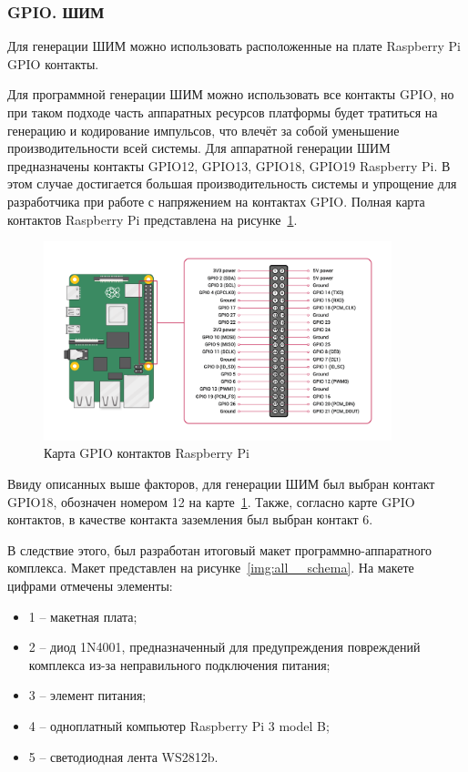 \subsubsection{GPIO. ШИМ}

Для генерации ШИМ можно использовать расположенные на плате Raspberry Pi GPIO контакты.

Для программной генерации ШИМ можно использовать все контакты GPIO, но при таком подходе часть аппаратных ресурсов платформы будет тратиться на генерацию и кодирование импульсов, что влечёт за собой уменьшение производительности всей системы. Для аппаратной генерации ШИМ предназначены контакты GPIO12, GPIO13, GPIO18, GPIO19 Raspberry Pi. В этом случае достигается большая производительность системы и упрощение для разработчика при работе с напряжением на контактах GPIO. Полная карта контактов Raspberry Pi представлена на рисунке~\ref{img:raspberrypi__GPIO_pinout_diagram}.

\begin{figure}[H]
  \centering
  \includegraphics[width=0.9\textwidth]{assets/images/practical/GPIO-Pinout-Diagram.png}
  \caption{Карта GPIO контактов Raspberry Pi}
  \label{img:raspberrypi__GPIO_pinout_diagram}
\end{figure}

Ввиду описанных выше факторов, для генерации ШИМ был выбран контакт GPIO18, обозначен номером 12 на карте~\ref{img:raspberrypi__GPIO_pinout_diagram}. Также, согласно карте GPIO контактов, в качестве контакта заземления был выбран контакт 6.

В следствие этого, был разработан итоговый макет программно-аппаратного комплекса. Макет представлен на рисунке~\ref{img:all__schema}. На макете цифрами отмечены элементы:

\begin{itemize}
  \item 1 -- макетная плата;
  \item 2 -- диод 1N4001, предназначенный для предупреждения повреждений комплекса из-за неправильного подключения питания;
  \item 3 -- элемент питания;
  \item 4 -- одноплатный компьютер Raspberry Pi 3 model B;
  \item 5 -- светодиодная лента WS2812b.
\end{itemize}

